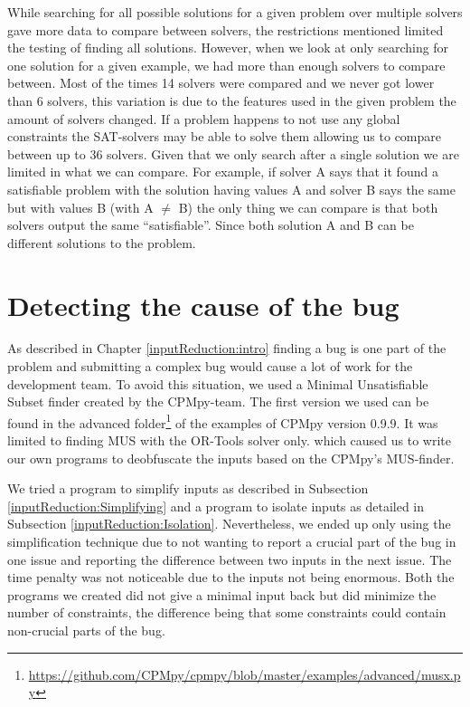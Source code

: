 While searching for all possible solutions for a given problem over multiple solvers gave more data to compare between solvers, the restrictions mentioned limited the testing of finding all solutions. However, when we look at only searching for one solution for a given example, we had more than enough solvers to compare between. Most of the times 14 solvers were compared and we never got lower than 6 solvers, this variation is due to the features used in the given problem the amount of solvers changed. If a problem happens to not use any global constraints the SAT-solvers may be able to solve them allowing us to compare between up to 36 solvers. Given that we only search after a single solution we are limited in what we can compare. For example, if solver A says that it found a satisfiable problem with the solution having values A and solver B says the same but with values B (with A $\neq$ B) the only thing we can compare is that both solvers output the same “satisfiable”. Since both solution A and B can be different solutions to the problem.


\section{Detecting the cause of the bug}
\label{impl:DetectingCause}
As described in Chapter \ref{inputReduction:intro} finding a bug is one part of the problem and submitting a complex bug would cause a lot of work for the development team. To avoid this situation, we used a Minimal Unsatisfiable Subset finder created by the CPMpy-team. The first version we used can be found in the advanced folder\footnote{\url{https://github.com/CPMpy/cpmpy/blob/master/examples/advanced/musx.py}} of the examples of CPMpy version 0.9.9. It was limited to finding MUS with the OR-Tools solver only. which caused us to write our own programs to deobfuscate the inputs based on the CPMpy’s MUS-finder. 

We tried a program to simplify inputs as described in Subsection \ref{inputReduction:Simplifying} and a program to isolate inputs as detailed in Subsection \ref{inputReduction:Isolation}. Nevertheless, we ended up only using the simplification technique due to not wanting to report a crucial part of the bug in one issue and reporting the difference between two inputs in the next issue. The time penalty was not noticeable due to the inputs not being enormous. Both the programs we created did not give a minimal input back but did minimize the number of constraints, the difference being that some constraints could contain non-crucial parts of the bug. 


